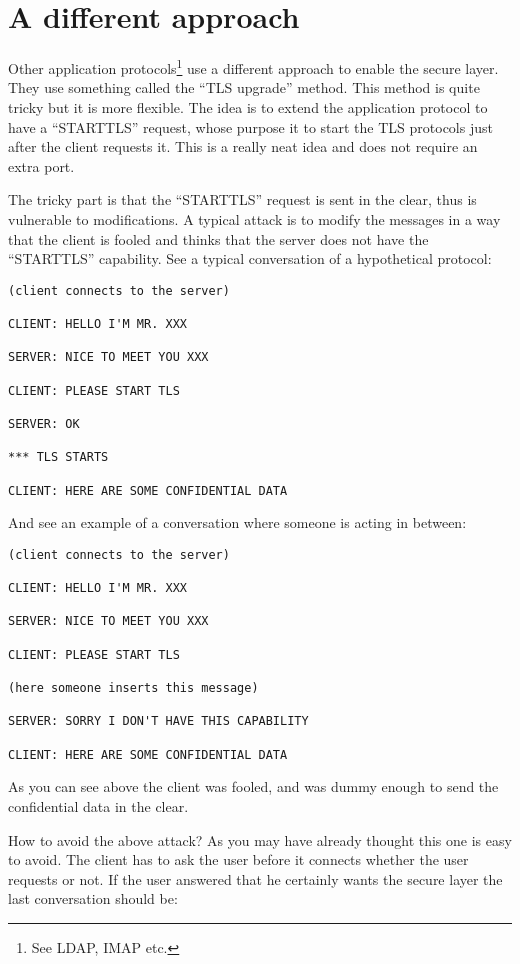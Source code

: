 \section{A different approach}
Other application protocols\footnote{See LDAP, IMAP etc.}
use a different approach to enable the secure layer.
They use something called the ``TLS upgrade'' method. This method
is quite tricky but it is more flexible. The idea is to extend
the application protocol to have a ``STARTTLS'' request, whose purpose
it to start the TLS protocols just after the client requests it.
This is a really neat idea and does not require an extra port.
\par
The tricky part is that the ``STARTTLS'' request is sent in the clear,
thus is vulnerable to modifications. A typical attack is to modify the
messages in a way that the client is fooled and thinks that the server
does not have the ``STARTTLS'' capability. See a typical conversation
of a hypothetical protocol:
\begin{verbatim}
(client connects to the server)

CLIENT: HELLO I'M MR. XXX

SERVER: NICE TO MEET YOU XXX

CLIENT: PLEASE START TLS

SERVER: OK

*** TLS STARTS

CLIENT: HERE ARE SOME CONFIDENTIAL DATA

\end{verbatim}

And see an example of a conversation where someone is acting
in between:

\begin{verbatim}
(client connects to the server)

CLIENT: HELLO I'M MR. XXX

SERVER: NICE TO MEET YOU XXX

CLIENT: PLEASE START TLS

(here someone inserts this message)

SERVER: SORRY I DON'T HAVE THIS CAPABILITY

CLIENT: HERE ARE SOME CONFIDENTIAL DATA

\end{verbatim}

As you can see above the client was fooled, and was dummy enough
to send the confidential data in the clear.
\par
How to avoid the above attack? As you may have already thought
this one is easy to avoid. The client has to ask the user before it connects
whether the user requests \tls{} or not. If the user answered that he
certainly wants the secure layer the last conversation should be:

